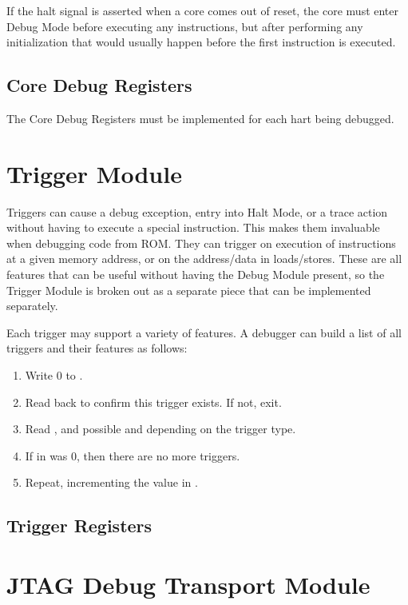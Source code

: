 \documentclass{article}
\newenvironment{steps}[1]
{
   \vspace{1ex}
   \noindent
   #1
   \begin{enumerate}[nosep]
}
{
   \end{enumerate}
   \vspace{1ex}
}
\begin{document}
If the halt signal is asserted when a core comes out of reset, the core must
enter Debug Mode before executing any instructions, but after performing any
initialization that would usually happen before the first instruction is
executed.

\subsection{Core Debug Registers} \label{debreg}

The Core Debug Registers must be implemented for each hart being debugged.



\section{Trigger Module}

Triggers can cause a debug exception, entry into Halt Mode, or a trace action
without having to execute a special instruction. This makes them invaluable
when debugging code from ROM. They can trigger on execution of instructions at
a given memory address, or on the address/data in loads/stores.  These are all
features that can be useful without having the Debug Module present, so the
Trigger Module is broken out as a separate piece that can be implemented
separately.

\begin{steps}{Each trigger may support a variety of features. A debugger can
    build a list of all triggers and their features as follows:}
\item Write 0 to \Rtselect.
\item Read back \Rtselect to confirm this trigger exists. If not, exit.
\item Read \Rtdataone, and possible \Rtdatatwo and \Rtdatathree depending on the
    trigger type.
\item If \Ftype in \Rtdataone was 0, then there are no more triggers.
\item Repeat, incrementing the value in \Rtselect.
\end{steps}

\subsection{Trigger Registers}



\section{JTAG Debug Transport Module}
\end{document}
